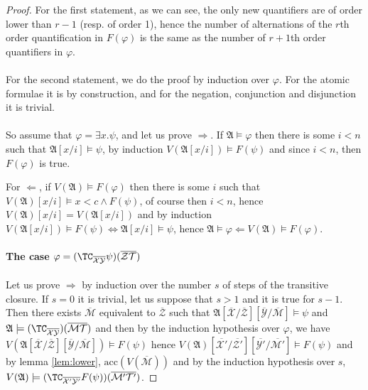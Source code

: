 \documentclass[a4paper,12pt]{article}
\theoremstyle{definition}
\renewcommand{\phi}{\varphi}
\newcommand{\mc}{\mathcal}
\newcommand{\mf}{\mathfrak}
\newcommand{\ol}{\overline}
\newcommand{\olmc}[1]{\overline{\mathcal{#1}}}
\begin{document}
\begin{proof}
  For the first statement, as we can see, the only new quantifiers are
  of order lower than $r-1$ (resp. of order 1), hence the number of
  alternations of the $r$th order quantification in $F(\phi)$ is the same
  as the number of $r+1$th order quantifiers in $\phi$.
\paragraph{}
For the second statement, we do the proof by induction over
$\phi$. For the atomic formulae it is by construction, and for the
negation, conjunction and disjunction it is trivial.

\paragraph{}So assume that $\phi=\exists x.\psi$, and let us prove $\Rightarrow$. If $\mf
A\models\phi$ then there is some $i<n$ such that $\mf
A[x/i]\models\psi$, by induction $V(\mf A[x/i])\models F(\psi)$ and
since $i<n$, then $F(\phi)$ is true.

For $\Leftarrow$, if $V(\mf A)\models F(\phi)$ then there is some $i$
such that $V(\mf A)[x/i]\models x<c\land F(\psi)$, of course then
$i<n$, hence $V(\mf A)[x/i]=V(\mf A[x/i])$ and by induction $V(\mf
A[x/i])\models F(\psi)\Leftrightarrow \mf A[x/i]\models \psi$, hence
$\mf A\models\phi\Leftarrow V(\mf A)\models F(\phi)$.
 
\paragraph{The case $\phi=(\TC_{\ol{\mc X}\ol{\mc Y}}\psi)(\ol{\mc
    Z}\ol{\mc T})$} 

Let us prove $\Rightarrow$ by induction over the number $s$ of steps
of the transitive closure. If $s=0$ it is trivial, let us suppose that
$s>1$ and it is true for $s-1$. Then there exists $\olmc M$ equivalent
to $\olmc Z$ such that $\mathfrak A[\olmc X/\olmc Z][\olmc Y/\olmc
M]\models\psi$ and $\mathfrak A\models (\TC_{\ol{\mc X}\ol{\mc
    Y}})(\ol{\mc M}\ol{\mc T})$ and then by the induction hypothesis
over $\phi$, we have $V(\mathfrak A[\olmc{X}/\olmc {Z}][\olmc
{Y}/\olmc{M}])\models F(\psi)$ hence $V(\mathfrak A)[\olmc{X'}/\olmc
{Z'}][\olmc {Y'}/\olmc{M'}]\models F(\psi)$ and by lemma
\ref{lem:lower}, $\text{acc}(V(\olmc M))$ and by the induction
hypothesis over $s$, $V(\mathfrak A)\models (\TC_{\ol{\mc X'}\ol{\mc
    Y'}}F(\psi))(\ol{\mc M'}\ol{\mc T'})$.


\end{proof}
\end{document}
